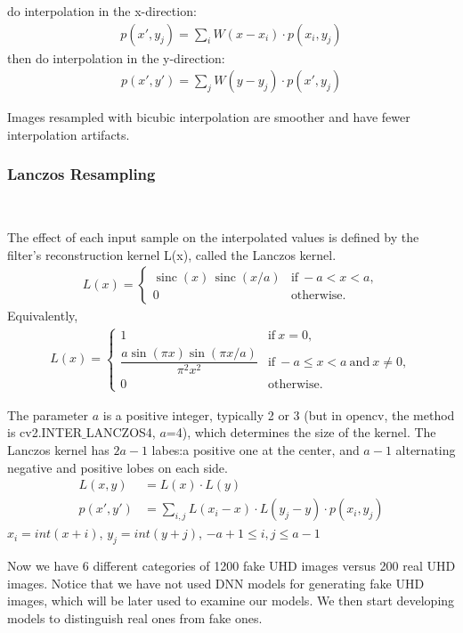 \documentclass[journal,conference]{IEEEtran}
\begin{document}
do interpolation in the x-direction:
\begin{align*}
p(x',y_j)=\sum_{i}{W(x-x_i)\cdot p(x_i,y_j)}
\end{align*}
then do interpolation in the y-direction:
\begin{align*}
p(x',y')=\sum_{j}{W(y-y_j)\cdot p(x',y_j)} 
\end{align*}
\par Images resampled with bicubic interpolation are smoother and have fewer interpolation artifacts.
~\\
\subsubsection{Lanczos Resampling}
~\\
\par The effect of each input sample on the interpolated values is defined by the filter's reconstruction kernel L(x), called the Lanczos kernel. 
\begin{align*}
{\displaystyle L(x)={\begin{cases}\operatorname {sinc} (x)\,\operatorname {sinc} (x/a)&{\text{if}}\ -a<x<a,\\0&{\text{otherwise}}.\end{cases}}}
\end{align*}
Equivalently,
\begin{align*}
{\displaystyle L(x)={\begin{cases}1&{\text{if}}\ x=0,\\{\dfrac {a\sin(\pi x)\sin(\pi x/a)}{\pi ^{2}x^{2}}}&{\text{if}}\ -a\leq x<a\ {\text{and}}\ x\neq 0,\\0&{\text{otherwise}}.\end{cases}}}
\end{align*}
\par The parameter $a$ is a positive integer, typically 2 or 3 (but in opencv, the method is cv2.INTER$\_$LANCZOS4, $a$=4), which determines the size of the kernel. The Lanczos kernel has $2a-1$ labes:a positive one at the center, and $a-1$ alternating negative and positive lobes on each side.
\begin{align*}
L(x,y) &= L(x) \cdot L(y)\\
p(x',y') &= \sum_{i,j}{L(x_i-x)\cdot L(y_j-y)\cdot p(x_i,y_j)}
\end{align*}
$x_i=int(x+i)$, $y_j=int(y+j)$, $-a+1\leq i, j \leq a-1$

Now we have 6 different categories of 1200 fake UHD images versus 200 real UHD images.
Notice that we have not used DNN models for generating fake UHD images, which will be later used to examine our models.
We then start developing models to distinguish real ones from fake ones.
\end{document}
